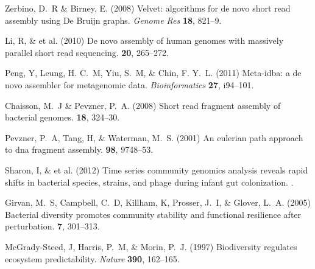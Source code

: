 \documentclass{pnastwo}
\begin{document}
\begin{article}
\begin{thebibliography}{10}
 Zerbino, D.~R \& Birney, E. \newblock (2008) Velvet:
algorithms for de novo short read assembly using De Bruijn graphs. \newblock
{\em Genome Res} {\bf 18}, 821--9.

 Li, R, \& et al. \newblock
(2010) {De novo assembly of human genomes with massively parallel short read
sequencing}.  {\bf 20}, 265--272.


 Peng, Y, Leung, H. C.~M, Yiu, S.~M, \& Chin, F. Y.~L.
\newblock (2011) Meta-idba: a de novo assembler for metagenomic data. \newblock
{\em Bioinformatics} {\bf 27}, i94--101.

 Chaisson, M.~J \& Pevzner, P.~A. \newblock (2008)
Short read fragment assembly of bacterial genomes.  {\bf 18}, 324--30.

 Pevzner, P.~A, Tang, H, \& Waterman, M.~S. \newblock
(2001) An eulerian path approach to dna fragment assembly.  {\bf 98}, 9748--53.


 Sharon, I, \& et al. \newblock (2012) {Time series community
genomics analysis reveals rapid shifts in bacterial species, strains, and phage
during infant gut colonization}. .


 Girvan, M.~S, Campbell, C.~D, Killham, K, Prosser, J.~I,
\& Glover, L.~A. \newblock (2005) {Bacterial diversity promotes community
stability and functional resilience after perturbation.}  {\bf 7}, 301--313.

 McGrady-Steed, J, Harris, P.~M, \& Morin, P.~J.
\newblock (1997) {Biodiversity regulates ecosystem predictability}. \newblock
{\em Nature} {\bf 390}, 162--165.


\end{thebibliography}
\end{article}
\end{document}
